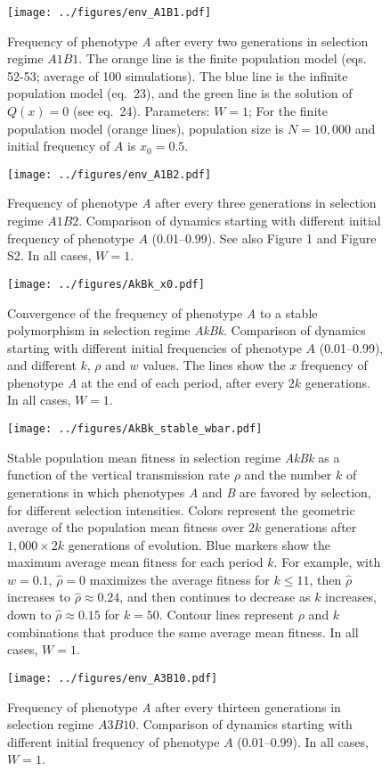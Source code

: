 \documentclass[]{article}
\newcommand{\beginsupplement}{%
        \setcounter{table}{0}
        \renewcommand{\thetable}{S\arabic{table}}%
        \setcounter{figure}{0}
        \renewcommand{\thefigure}{S\arabic{figure}}%
     }
\begin{document}
\beginsupplement

\begin{figure}
\centering
\texttt{[image: ../figures/env\_A1B1.pdf]}
\caption{Frequency of phenotype \emph{A} after every two generations in
selection regime \(A1B1\). The orange line is the finite population model
(eqs. 52-53; average of 100 simulations). The blue line is the infinite population model
(eq.\ 23), and the green line is the  solution of \(Q(x)=0\) (see eq.\ 24). Parameters: \(W=1\); For the finite population model (orange lines), population size is \(N=10,000\) and initial frequency of \(A\) is \(x_0=0.5\).}\label{fig:env_A1B1}
\end{figure}

\begin{figure}
\centering
\texttt{[image: ../figures/env\_A1B2.pdf]}
\caption{Frequency of phenotype \emph{A} after every three generations in
selection regime $A1B2$. Comparison of dynamics starting with
different initial frequency of phenotype \(A\) (0.01--0.99).
See also Figure 1 and Figure S2. In all cases, $W=1$.}\label{fig:env_A1B2}
\end{figure}

\begin{figure}
\centering
\texttt{[image: ../figures/AkBk\_x0.pdf]}
\caption{Convergence of the frequency of phenotype \emph{A} to a stable polymorphism in selection regime \emph{AkBk}.
Comparison of dynamics starting with different initial frequencies of phenotype \(A\) (0.01--0.99), and different $k$, $\rho$ and $w$ values.
The lines show the $x$ frequency of phenotype \emph{A} at the end of each period, after every $2k$ generations.
In all cases, $W=1$.}\label{fig:AkBk_x0}
\end{figure}

\begin{figure}
\centering
\texttt{[image: ../figures/AkBk\_stable\_wbar.pdf]}
\caption{Stable population mean fitness in selection regime \emph{AkBk} as a function of the vertical transmission rate \(\rho\) and the number \(k\) of generations in which phenotypes \emph{A} and \emph{B} are favored by selection, for different selection intensities.
Colors represent the geometric average of the population mean fitness over \(2k\) generations after \(1,000 \times 2k\) generations of evolution.
Blue markers show the maximum average mean fitness for each period \(k\).
For example, with \(w=0.1\), \(\hat{\rho}=0\) maximizes the average fitness for \(k \le 11\), then \(\hat{\rho}\) increases to \(\hat{\rho} \approx 0.24\), and then continues to decrease as \(k\) increases, down to \(\hat{\rho} \approx 0.15\) for \(k=50\).
Contour lines represent \(\rho\) and \(k\) combinations that produce the same average mean fitness. 
In all cases, $W=1$.}\label{fig:AkBk_stable_wbar}
\end{figure}

\begin{figure}
\centering
\texttt{[image: ../figures/env\_A3B10.pdf]}
\caption{Frequency of phenotype \emph{A} after every thirteen generations in
selection regime $A3B10$. Comparison of dynamics starting with
different initial frequency of phenotype \(A\) (0.01--0.99).
In all cases, $W=1$.}\label{fig:env_A3B10}
\end{figure}
\end{document}
